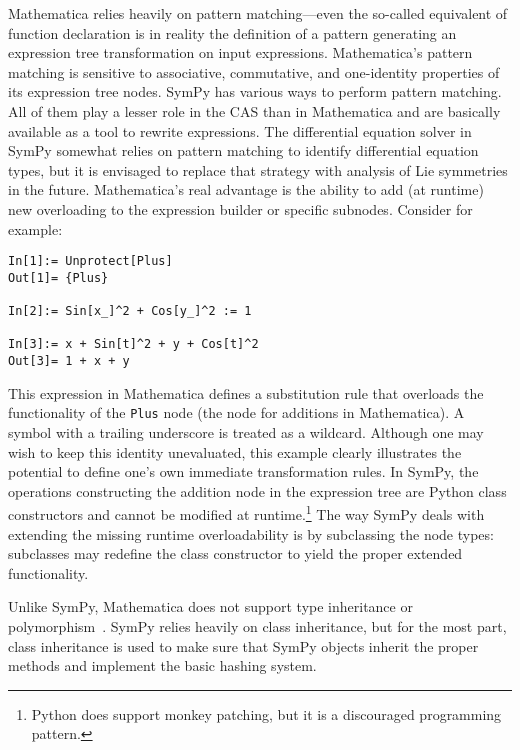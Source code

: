 


Mathematica relies heavily on pattern matching---even the so-called equivalent of function declaration is in reality
the definition of a pattern generating an expression tree transformation
on input expressions.
%
Mathematica's pattern matching is sensitive to
associative, commutative, and
one-identity properties of its expression tree
nodes.
%
SymPy has various ways to perform pattern matching.
All of them play a lesser role in the CAS than in Mathematica
and are basically available as a tool to rewrite expressions.
The differential equation solver in SymPy somewhat relies on pattern matching to
identify differential equation types, but it is envisaged to replace
that strategy with analysis of Lie symmetries in the future.
Mathematica's real advantage is the ability to add (at runtime) new overloading
to the expression builder or specific subnodes.
Consider for example:
\begin{verbatim}
In[1]:= Unprotect[Plus]
Out[1]= {Plus}

In[2]:= Sin[x_]^2 + Cos[y_]^2 := 1

In[3]:= x + Sin[t]^2 + y + Cos[t]^2
Out[3]= 1 + x + y
\end{verbatim}
This expression in Mathematica defines a substitution rule that overloads
the functionality of the \texttt{Plus} node (the node for additions in Mathematica).
A symbol with a trailing underscore is treated as a wildcard.
Although one may wish to keep this identity unevaluated, this example clearly
illustrates the potential to define
one's own immediate transformation rules.
In SymPy, the operations constructing the addition node in the expression tree
are Python class constructors
and cannot be modified at runtime.\footnote{Python does support monkey
patching, but it is a discouraged programming pattern.}
The way SymPy deals with extending the missing runtime overloadability
is by subclassing the node types: subclasses may redefine the class constructor
to yield the proper extended functionality.




Unlike SymPy, Mathematica does not support type inheritance or poly\-morph\-ism~\cite{Fateman1992}.
%
SymPy relies heavily on class inheritance, but for the most part,
class inheritance is used to make sure that SymPy objects inherit the proper
methods and implement the basic hashing system.

